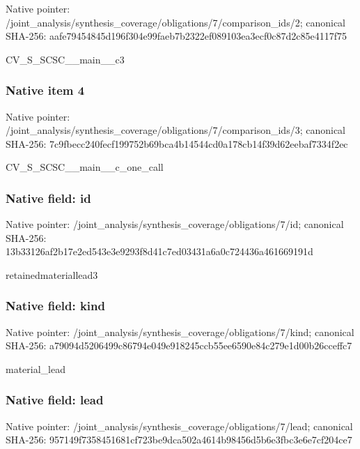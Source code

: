 \documentclass[10pt,a4paper]{article}
\begin{document}
Native pointer: /joint\_analysis/synthesi\allowbreak{}s\_coverage/obligations/7\allowbreak{}/comparison\_ids/2; canonical SHA-256: aafe79454845d196f304e99f\allowbreak{}aeb7b2322ef089103ea3ecf0\allowbreak{}c87d2c85e4117f75


CV\_S\_SCSC\_\_main\_\_c3


\subsubsection{Native item 4}


Native pointer: /joint\_analysis/synthesi\allowbreak{}s\_coverage/obligations/7\allowbreak{}/comparison\_ids/3; canonical SHA-256: 7c9fbecc240fecf199752b69\allowbreak{}bca4b14544cd0a178cb14f39\allowbreak{}d62eebaf7334f2ec


CV\_S\_SCSC\_\_main\_\_c\_one\_call


\subsubsection{Native field: id}


Native pointer: /joint\_analysis/synthesi\allowbreak{}s\_coverage/obligations/7\allowbreak{}/id; canonical SHA-256: 13b33126af2b17e2ed543e3e\allowbreak{}9293f8d41c7ed03431a6a0c7\allowbreak{}24436a461669191d


retainedmateriallead3


\subsubsection{Native field: kind}


Native pointer: /joint\_analysis/synthesi\allowbreak{}s\_coverage/obligations/7\allowbreak{}/kind; canonical SHA-256: a79094d5206499c86794e049\allowbreak{}e918245ccb55ee6590e84c27\allowbreak{}9e1d00b26cceffc7


material\_lead


\subsubsection{Native field: lead}


Native pointer: /joint\_analysis/synthesi\allowbreak{}s\_coverage/obligations/7\allowbreak{}/lead; canonical SHA-256: 957149f7358451681cf723be\allowbreak{}9dca502a4614b98456d5b6e3\allowbreak{}fbc3e6e7cf204ce7
\end{document}
